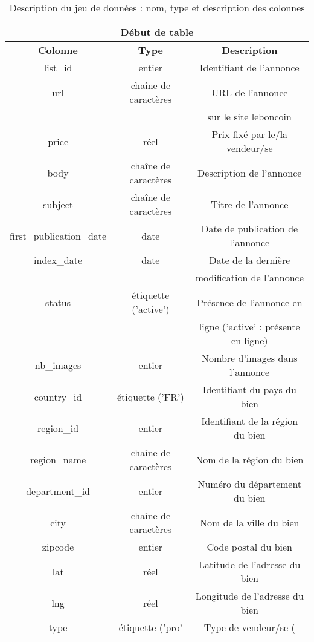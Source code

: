 \documentclass[a4paper, 12pt, twoside]{report}
\begin{document}
		\begin{longtable}[c]{|c|c|c|}
			\caption{Description du jeu de données : nom, type et description des colonnes \label{tabColonne}} \\
			\hline
			\multicolumn{3}{|c|}{Début de table} \\
				\hline
				{\bf Colonne} & {\bf Type} & {\bf Description} \\
				\hline
				list\_id & entier & Identifiant de l'annonce \\ 
				\hline 
				url & chaîne de caractères & URL de l'annonce \\ 
				& & sur le site leboncoin \\ 
				\hline 
				price & réel & Prix fixé par le/la vendeur/se \\ 
				\hline 
				body & chaîne de caractères & Description de l'annonce \\ 
				\hline 
				subject & chaîne de caractères & Titre de l'annonce \\ 
				\hline 
				first\_publication\_date & date & Date de publication de l'annonce \\ 
				\hline 
				index\_date & date & Date de la dernière \\ 
				& & modification de l'annonce \\ 
				\hline 
				status & étiquette ('active') & Présence de l'annonce en \\ 
				& & ligne ('active' : présente en ligne) \\ 
				\hline 
				nb\_images & entier & Nombre d'images dans l'annonce \\ 
				\hline 
				country\_id & étiquette ('FR') & Identifiant du pays du bien \\ 
				\hline 
				region\_id & entier & Identifiant de la région du bien \\ 
				\hline 
				region\_name & chaîne de caractères & Nom de la région du bien \\ 
				\hline 
				department\_id & entier & Numéro du département du bien \\ 
				\hline 
				city & chaîne de caractères & Nom de la ville du bien \\ 
				\hline 
				zipcode & entier & Code postal du bien \\ 
				\hline 
				lat & réel & Latitude de l'adresse du bien \\ 
				\hline 
				lng & réel & Longitude de l'adresse du bien \\ 
				\hline 
				type & étiquette ('pro' & Type de vendeur/se ( \\ 

\end{longtable}
\end{document}
